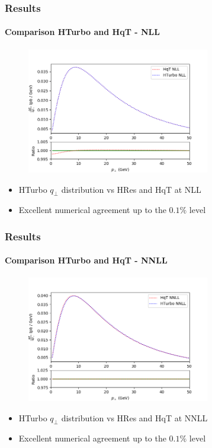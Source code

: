 \documentclass[aspectratio=43]{beamer}
\begin{document}
\begin{frame}

	\frametitle{Results}
	\framesubtitle{Comparison HTurbo and HqT - NLL}
	
	\begin{figure}
		\includegraphics[width = 8cm]{plots/part3/hturbo_NLL.png}
	\end{figure}

	\begin{itemize}
		\item HTurbo $q_{\perp}$ distribution vs HRes and HqT at NLL
		\item Excellent numerical agreement up to the $0.1\%$ level
	\end{itemize}

\end{frame}

\begin{frame}

	\frametitle{Results}
	\framesubtitle{Comparison HTurbo and HqT - NNLL}
	
	\begin{figure}
		\includegraphics[width = 8cm]{plots/part3/hturbo_NNLL_f2only2.png}
	\end{figure}
	
	\begin{itemize}
		\item HTurbo $q_{\perp}$ distribution vs HRes and HqT at NNLL
		\item Excellent numerical agreement up to the $0.1\%$ level
\end{itemize}

\end{frame}
\end{document}
